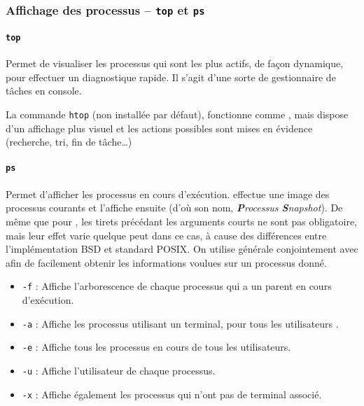 \subsubsection{Affichage des processus -- \texttt{top} et \texttt{ps}}

\paragraph{\texttt{top}} 
Permet de visualiser les processus qui sont les plus actifs, de façon dynamique, pour effectuer un diagnostique rapide. Il s'agit d'une sorte de gestionnaire de tâches en console.

 La commande \texttt{htop} (non installée par défaut), fonctionne comme , mais dispose d'un affichage plus visuel et les actions possibles sont mises en évidence (recherche, tri, fin de tâche\dots)

\paragraph{\texttt{ps}} 
Permet d'afficher les processus en cours d'exécution.  effectue une image des processus courants et l'affiche ensuite (d'où son nom, \textit{\textbf{P}rocessus \textbf{S}napshot}). De même que pour , les tirets précédant les arguments courts ne sont pas obligatoire, mais leur effet varie quelque peut dans ce cas, à cause des différences entre l'implémentation BSD et standard POSIX.
 On utilise générale  conjointement avec  afin de facilement obtenir les informations voulues sur un processus donné.

\begin{itemize}
    \item \texttt{-f} : Affiche l'arborescence de chaque processus qui a un parent en cours d'exécution.
    \item \texttt{-a} : Affiche les processus utilisant un terminal, pour tous les utilisateurs .
    \item \texttt{-e} : Affiche tous les processus en cours de tous les utilisateurs.
    \item \texttt{-u} : Affiche l'utilisateur de chaque processus.
    \item \texttt{-x} : Affiche également les processus qui n'ont pas de terminal associé.
\end{itemize}

